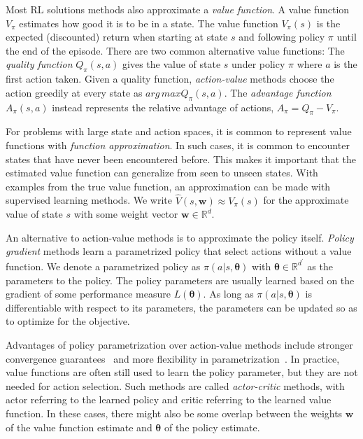 Most RL solutions methods also approximate a \textit{value function}.
A value function \(V_\pi\) estimates how good it is to be in a state.
The value function \(V_\pi(s)\) is the expected (discounted) return when starting at state \(s\) and following policy \(\pi\) until the end of the episode.
There are two common alternative value functions:
The \textit{quality function} \(Q_\pi(s,a)\) gives the value of state \(s\) under policy \(\pi\) where \(a\) is the first action taken.
Given a quality function, \textit{action-value} methods choose the action greedily at every state as \(arg\,max Q_\pi(s, a)\).
The \textit{advantage function} \(A_\pi(s, a)\) instead represents the relative advantage of actions, \(A_\pi = Q_\pi - V_\pi\).~\cite{sutton_reinforcement_2018}

For problems with large state and action spaces, it is common to represent value functions with \textit{function approximation}.
In such cases, it is common to encounter states that have never been encountered before.
This makes it important that the estimated value function can generalize from seen to unseen states.
With examples from the true value function, an approximation can be made with supervised learning methods.
We write \(\hat{V}(s,\mathbf{w}) \approx V_\pi(s)\) for the approximate value of state \(s\) with some weight vector \(\mathbf{w} \in \mathbb{R}^d\).~\cite{sutton_reinforcement_2018}

An alternative to action-value methods is to approximate the policy itself.
\textit{Policy gradient} methods learn a parametrized policy that select actions without a value function.
We denote a parametrized policy as \(\pi(a|s,\boldsymbol{\theta})\) with \(\boldsymbol{\theta} \in \mathbb{R}^{d^\prime}\) as the parameters to the policy.
The policy parameters are usually learned based on the gradient of some performance measure \(L(\boldsymbol{\theta})\).
As long as \(\pi(a|s,\boldsymbol{\theta})\) is differentiable with respect to its parameters, the parameters can be updated so as to optimize for the objective.~\cite{sutton_policy_1999}

Advantages of policy parametrization over action-value methods include stronger convergence guarantees~\cite{sutton_policy_1999} and more flexibility in parametrization~\cite{sutton_reinforcement_2018}.
In practice, value functions are often still used to learn the policy parameter, but they are not needed for action selection.
Such methods are called \textit{actor-critic} methods, with actor referring to the learned policy and critic referring to the learned value function.
In these cases, there might also be some overlap between the weights \(\mathbf{w}\) of the value function estimate and \(\boldsymbol{\theta}\) of the policy estimate. 

